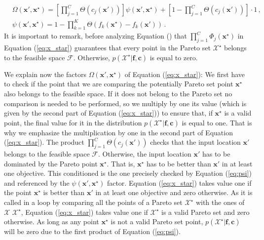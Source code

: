 \begin{align}
& \Omega(\textbf{x}',\textbf{x}^{\star})  = \left[\prod_{j=1}^{C}\Theta(c_j(\mathbf{x}'))\right] 
\psi(\textbf{x}',\textbf{x}^{\star}) + \left[1 - \prod_{j=1}^{C}\Theta(c_j(\textbf{x}')) \right] \cdot 1\,,\\
& \psi(\textbf{x}',\textbf{x}^{\star}) = 1 - \prod_{k=1}^K \Theta (f_k(\textbf{x}^{\star})-f_k(\textbf{x}'))\,.
\label{eq:psi}
\end{align}
It is important to remark, before analyzing Equation (\label{eq:psi}) that $\prod_{j=1}^{C}\Phi_j(\textbf{x}^{\star})$ in Equation (\ref{eq:x_star}) guarantees that every
point in the Pareto set $\mathcal{X}^\star$ belongs to the feasible space $\mathcal{F}$.
Otherwise, $p(\mathcal{X}^\star |\mathbf{f},\mathbf{c})$ is equal to zero.

We explain now the factors $\Omega(\mathbf{x}',\mathbf{x}^\star)$ of Equation (\ref{eq:x_star}):
We first have to check if the point that we are comparing the potentially Pareto set point $\mathbf{x}^{\star}$ also belongs to the feasible space. If it does not belong to the Pareto set no comparison is needed to be performed, so we multiply by one its value (which is given by the second part of Equation (\ref{eq:x_star})) to ensure that, if $\mathbf{x}^{\star}$ is a valid point, the final value for it in the distribution $p(\mathcal{X}^\star |\mathbf{f},\mathbf{c})$ is equal to one. That is why we emphasize the multiplication by one in the second part of Equation (\ref{eq:x_star}). The product $\prod_{j=1}^{C}\Theta(c_j(\textbf{x}'))$ checks that the input location $\mathbf{x}'$
belongs to the feasible space $\mathcal{F}$. Otherwise, the input location $\mathbf{x}'$ has to be dominated by
the Pareto point $\mathbf{x}^\star$. That is, $\mathbf{x}^\star$ has to be better than
$\mathbf{x}'$ in at least one objective. This conditioned is the one precisely checked by Equation (\ref{eq:psi}) and referenced by the $\psi(\textbf{x}',\textbf{x}^{\star})$ factor. Equation (\ref{eq:x_star}) takes value one if the point $\mathbf{x}^\star$ is better than
$\mathbf{x}'$ in at least one objective and zero otherwise. As it is called in a loop by comparing all the points of a Pareto set $\mathcal{X}^\star$ with the ones of $\mathcal{X}$ $\mathcal{X}^\star$, Equation (\ref{eq:x_star}) takes value one if $\mathcal{X}^\star$ is a valid Pareto set and zero otherwise. As long as any point $\mathbf{x}^{\star}$ is not a valid Pareto set point, $p(\mathcal{X}^{\star}|\textbf{f},\textbf{c})$ will be zero due to the first product of Equation (\ref{eq:psi}).

